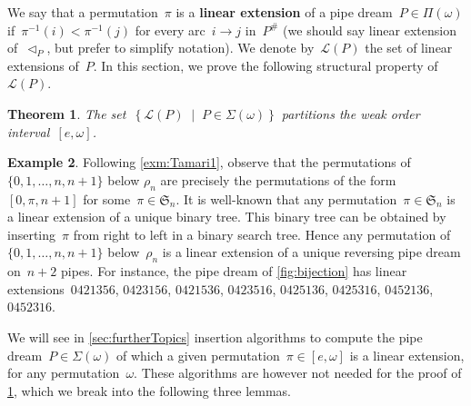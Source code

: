 \documentclass{amsart}
\newtheorem{theorem}{Theorem}[section]
\theoremstyle{definition}
\newtheorem{example}[theorem]{Example}
\newcommand{\set}[2]{\left\{ #1 \;\middle|\; #2 \right\}} %
\newcommand{\ie}{\textit{i.e.}~} %
\newcommand{\defn}[1]{\textbf{\textsf{\color{PineGreen} #1}}} %
\newcommand{\fS}{\mathfrak{S}} %
\newcommand{\pipeDreams}{\Pi} %
\newcommand{\contact}{^\#} %
\newcommand{\acyclicPipeDreams}{\Sigma} %
\newcommand{\linearExtensions}{\mathcal{L}} %
\newcommand{\less}{\vartriangleleft} %
\newcommand{\contactLess}[1]{\less_{#1}} %
\begin{document}
We say that a permutation~$\pi$ is a \defn{linear extension} of a pipe dream~$P \in \pipeDreams(\omega)$ if~$\pi^{-1}(i) < \pi^{-1}(j)$ for every arc~$i \to j$ in~$P\contact$ (we should say linear extension of~$\contactLess{P}$, but prefer to simplify notation).
We denote by~$\linearExtensions(P)$ the set of linear extensions of~$P$.
In this section, we prove the following structural property of~$\linearExtensions(P)$.

\begin{theorem}
\label{thm:partitionPipeDreams}
The set~$\set{\linearExtensions(P)}{P \in \acyclicPipeDreams(\omega)}$ partitions the weak order interval~$[e,\omega]$.
\end{theorem}

\begin{example}
\label{exm:Tamari2}
Following \cref{exm:Tamari1}, observe that the permutations of~$\{0, 1, \dots, n, n+1\}$ below $\rho_n$ are precisely the permutations of the form~$[0, \pi, n+1]$ for some~$\pi \in \fS_n$.
It is well-known that any permutation~$\pi \in \fS_n$ is a linear extension of a unique binary tree.
This binary tree can be obtained by inserting~$\pi$ from right to left in a binary search tree.
Hence any permutation of~$\{0, 1, \dots, n, n+1\}$ below~$\rho_n$ is a linear extension of a unique reversing pipe dream on~$n+2$ pipes.
For instance, the pipe dream of \cref{fig:bijection} has linear extensions~$0421356$, $0423156$, $0421536$, $0423516$, $0425136$, $0425316$, $0452136$, $0452316$.
\end{example}

We will see in \cref{sec:furtherTopics} insertion algorithms to compute the pipe dream~$P \in \acyclicPipeDreams(\omega)$ of which a given permutation~$\pi \in [e,\omega]$ is a linear extension, for any permutation~$\omega$.
These algorithms are however not needed for the proof of \cref{thm:partitionPipeDreams}, which we break into the following three lemmas.
\end{document}
